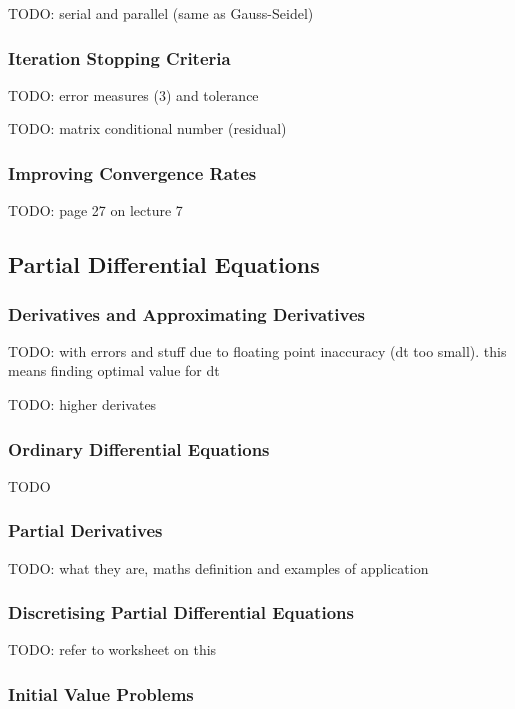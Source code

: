 \documentclass{article}
\begin{document}
TODO: serial and parallel (same as Gauss-Seidel)

\subsubsection{Iteration Stopping Criteria}

TODO: error measures (3) and tolerance

TODO: matrix conditional number (residual)

\subsubsection{Improving Convergence Rates}

TODO: page 27 on lecture 7

\subsection{Partial Differential Equations}

\subsubsection{Derivatives and Approximating Derivatives}

TODO: with errors and stuff  due to floating point inaccuracy (dt too small). this means finding optimal value for dt

TODO: higher derivates

\subsubsection{Ordinary Differential Equations}

TODO

\subsubsection{Partial Derivatives}

TODO: what they are, maths definition and examples of application

\subsubsection{Discretising Partial Differential Equations}

TODO: refer to worksheet on this

\subsubsection{Initial Value Problems}
\end{document}
